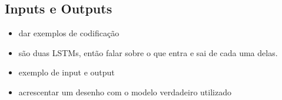 \subsection{Inputs e Outputs}
\begin{itemize}
    \item dar exemplos de codificação
    \item são duas LSTMs, então falar sobre o que entra e sai de cada uma delas.
    \item exemplo de input e output
    \item acrescentar um desenho com o modelo verdadeiro utilizado
\end{itemize}


